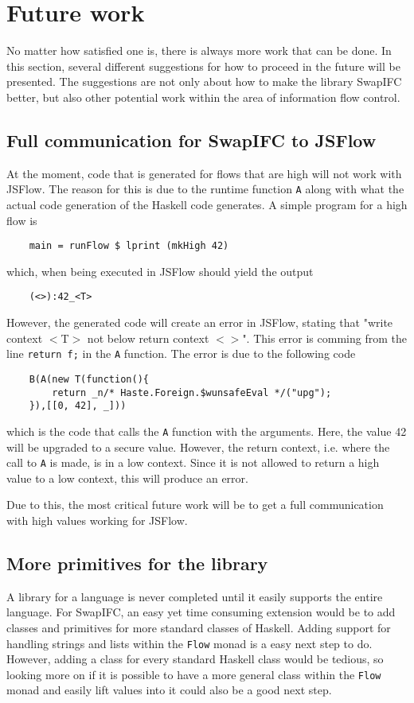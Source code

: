 \chapter{Future work}
\label{chapter:future}
No matter how satisfied one is, there is always more work that can be done. In this section, several different suggestions for how to proceed in the future will be presented. The suggestions are not only about how to make the library SwapIFC better, but also other potential work within the area of information flow control.

\section{Full communication for SwapIFC to JSFlow}
At the moment, code that is generated for flows that are high will not work with JSFlow. The reason for this is due to the runtime function {\tt A} along with what the actual code generation of the Haskell code generates. A simple program for a high flow is
\begin{verbatim}
    main = runFlow $ lprint (mkHigh 42)
\end{verbatim}
which, when being executed in JSFlow should yield the output
\begin{verbatim}
    (<>):42_<T>
\end{verbatim}
However, the generated code will create an error in JSFlow, stating that "write context \(<\)T\(>\) not below return context \(<>\)". This error is comming from the line {\tt return f;} in the {\tt A} function. The error is due to the following code
\begin{verbatim}
    B(A(new T(function(){
        return _n/* Haste.Foreign.$wunsafeEval */("upg");
    }),[[0, 42], _]))
\end{verbatim}
which is the code that calls the {\tt A} function with the arguments. Here, the value 42 will be upgraded to a secure value. However, the return context, i.e. where the call to {\tt A} is made, is in a low context. Since it is not allowed to return a high value to a low context, this will produce an error.

Due to this, the most critical future work will be to get a full communication with high values working for JSFlow.

\section{More primitives for the library}
\label{chapter:future-primitives}
A library for a language is never completed until it easily supports the entire language. For SwapIFC, an easy yet time consuming extension would be to add classes and primitives for more standard classes of Haskell. Adding support for handling strings and lists within the {\tt Flow} monad is a easy next step to do. However, adding a class for every standard Haskell class would be tedious, so looking more on if it is possible to have a more general class within the {\tt Flow} monad and easily lift values into it could also be a good next step.

